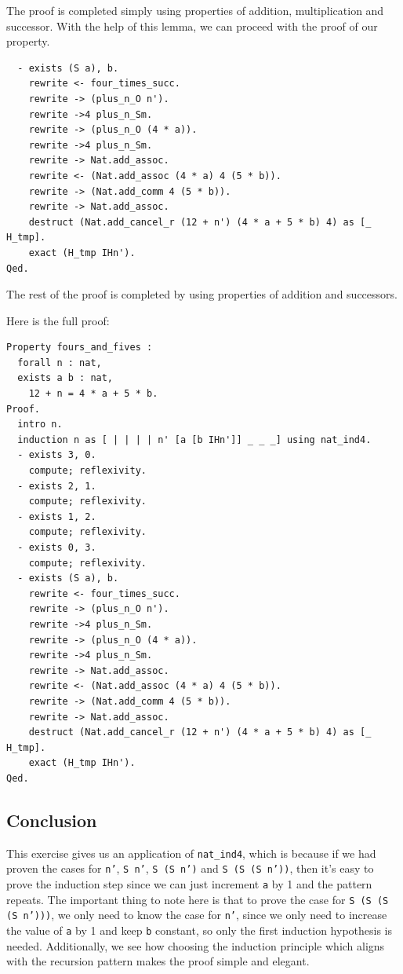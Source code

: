 \documentclass{article}
\begin{document}
The proof is completed simply using properties of addition, multiplication and successor. With the help of this lemma, we can proceed with the proof of our property.

\begin{lstlisting}
  - exists (S a), b.
    rewrite <- four_times_succ.
    rewrite -> (plus_n_O n').
    rewrite ->4 plus_n_Sm.
    rewrite -> (plus_n_O (4 * a)).
    rewrite ->4 plus_n_Sm.
    rewrite -> Nat.add_assoc.
    rewrite <- (Nat.add_assoc (4 * a) 4 (5 * b)).
    rewrite -> (Nat.add_comm 4 (5 * b)).
    rewrite -> Nat.add_assoc.
    destruct (Nat.add_cancel_r (12 + n') (4 * a + 5 * b) 4) as [_ H_tmp].
    exact (H_tmp IHn').
Qed.
\end{lstlisting}

The rest of the proof is completed by using properties of addition and successors. 

Here is the full proof:

\begin{lstlisting}
Property fours_and_fives :
  forall n : nat,
  exists a b : nat,
    12 + n = 4 * a + 5 * b.
Proof.
  intro n.
  induction n as [ | | | | n' [a [b IHn']] _ _ _] using nat_ind4.
  - exists 3, 0.
    compute; reflexivity.
  - exists 2, 1.
    compute; reflexivity.
  - exists 1, 2.
    compute; reflexivity.
  - exists 0, 3.
    compute; reflexivity.
  - exists (S a), b.
    rewrite <- four_times_succ.
    rewrite -> (plus_n_O n').
    rewrite ->4 plus_n_Sm.
    rewrite -> (plus_n_O (4 * a)).
    rewrite ->4 plus_n_Sm.
    rewrite -> Nat.add_assoc.
    rewrite <- (Nat.add_assoc (4 * a) 4 (5 * b)).
    rewrite -> (Nat.add_comm 4 (5 * b)).
    rewrite -> Nat.add_assoc.
    destruct (Nat.add_cancel_r (12 + n') (4 * a + 5 * b) 4) as [_ H_tmp].
    exact (H_tmp IHn').
Qed.
\end{lstlisting}

\subsection{Conclusion}
This exercise gives us an application of \texttt{nat\_ind4}, which is because if we had proven the cases for \texttt{n'}, \texttt{S n'}, \texttt{S (S n')} and \texttt{S (S (S n'))}, then it's easy to prove the induction step since we can just increment \texttt{a} by 1 and the pattern repeats. The important thing to note here is that to prove the case for \texttt{S (S (S (S n')))}, we only need to know the case for \texttt{n'}, since we only need to increase the value of \texttt{a} by 1 and keep \texttt{b} constant, so only the first induction hypothesis is needed. Additionally, we see how choosing the induction principle which aligns with the recursion pattern makes the proof simple and elegant.
\end{document}
